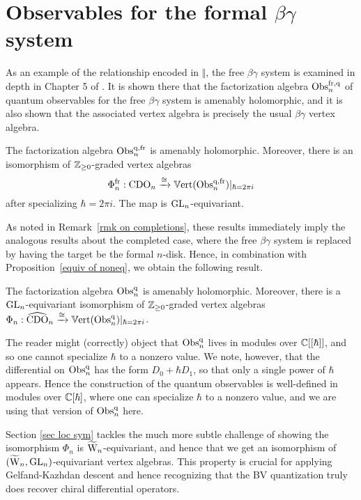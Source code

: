 \section{Observables for the formal $\beta\gamma$ system}

As an example of the relationship encoded in $\Vert$,
the free $\beta\gamma$ system is examined in depth in Chapter 5 of \cite{CG1}.
It is shown there that the factorization algebra ${\rm Obs}^{{\rm fr},{\rm q}}_n$ of quantum observables for the free $\beta\gamma$ system is amenably holomorphic,
and it is also shown that the associated vertex algebra is precisely the usual $\beta\gamma$ vertex algebra.

\begin{thm}
The factorization algebra ${\rm Obs}^{{\rm q},{\rm fr}}_n$ is amenably holomorphic. 
Moreover, 
there is an isomorphism of $\mathbb Z_{\geq 0}$-graded vertex algebras 
\[
\Phi^{{\rm fr}}_n : {\rm CDO}_n \xrightarrow{\cong} \mathbb{V}{\rm ert}({\rm Obs}^{{\rm q},{\rm fr}}_n)|_{\hbar= 2 \pi i}
\] 
after specializing $\hbar=2 \pi i$.
The map is ${\rm GL}_n$-equivariant.
\end{thm}

As noted in Remark~\ref{rmk on completions}, 
these results immediately imply the analogous results about the completed case, 
where the free $\beta\gamma$ system is replaced by having the target be the formal $n$-disk.
Hence, in combination with Proposition~\ref{equiv of noneq},
we obtain the following result.

\begin{cor}
The factorization algebra ${\rm Obs}^{\rm q}_n$ is amenably holomorphic. 
Moreover, there is a ${\rm GL}_n$-equivariant isomorphism of $\mathbb Z_{\geq 0}$-graded vertex algebras 
$\Phi_n : \widehat{\rm CDO}_n \xrightarrow{\cong} \mathbb{V}{\rm ert}({\rm Obs}^{\rm q}_n)|_{\hbar= 2 \pi i}$.
\end{cor}

\begin{rmk}
The reader might (correctly) object that ${\rm Obs}^{\rm q}_n$ lives in modules over $\mathbb C[[\hbar]]$,  
and so one cannot specialize $\hbar$ to a nonzero value.
We note, however, that the differential on ${\rm Obs}^{\rm q}_n$ has the form $D_0 + \hbar D_1$, 
so that only a single power of $\hbar$ appears.
Hence the construction of the quantum observables is well-defined in modules over $\mathbb C[\hbar]$,
where one can specialize $\hbar$ to a nonzero value,
and we are using that version of ${\rm Obs}^{\rm q}_n$ here.
\end{rmk}

Section \ref{sec loc sym} tackles the much more subtle challenge of showing the isomorphism $\Phi_n$ is $\widetilde{{{\rm W}}}_n$-equivariant,
and hence that we get an isomorphism of $(\widetilde{{{\rm W}}}_n,{\rm GL}_n)$-equivariant vertex algebras.
This property is crucial for applying Gelfand-Kazhdan descent 
and hence recognizing that the BV quantization truly does recover chiral differential operators.

